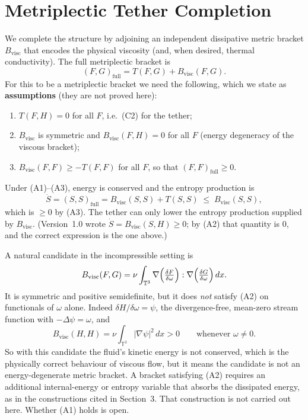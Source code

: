 \documentclass[11pt,a4paper]{article}
\begin{document}
\section{Metriplectic Tether Completion}
We complete the structure by adjoining an independent dissipative metric bracket \(B_{\mathrm{visc}}\) that encodes the physical viscosity (and, when desired, thermal conductivity). The full metriplectic bracket is
\begin{equation}
(F,G)_{\mathrm{full}} = T(F,G) + B_{\mathrm{visc}}(F,G).
\end{equation}
For this to be a metriplectic bracket we need the following, which we state as \textbf{assumptions} (they are not proved here):
\begin{enumerate}[label=(A\arabic*)]
\item \(T(F,H)=0\) for all \(F\), i.e.\ (C2) for the tether;
\item \(B_{\mathrm{visc}}\) is symmetric and \(B_{\mathrm{visc}}(F,H)=0\) for all \(F\) (energy degeneracy of the viscous bracket);
\item \(B_{\mathrm{visc}}(F,F)\ge -T(F,F)\) for all \(F\), so that \((F,F)_{\mathrm{full}}\ge0\).
\end{enumerate}
Under (A1)--(A3), energy is conserved and the entropy production is
\begin{equation}
\dot S = (S,S)_{\mathrm{full}} = B_{\mathrm{visc}}(S,S) + T(S,S) \;\le\; B_{\mathrm{visc}}(S,S),
\end{equation}
which is \(\ge0\) by (A3). The tether can only lower the entropy production supplied by \(B_{\mathrm{visc}}\). (Version~1.0 wrote \(\dot S=B_{\mathrm{visc}}(S,H)\ge0\); by (A2) that quantity is \(0\), and the correct expression is the one above.)

A natural candidate in the incompressible setting is
\begin{equation}
B_{\mathrm{visc}}(F,G) = \nu\int_{\mathbb{T}^3}
\nabla\Bigl(\tfrac{\delta F}{\delta\omega}\Bigr):\nabla\Bigl(\tfrac{\delta G}{\delta\omega}\Bigr)\,dx .
\end{equation}
It is symmetric and positive semidefinite, but it does \emph{not} satisfy (A2) on functionals of \(\omega\) alone. Indeed \(\delta H/\delta\omega=\psi\), the divergence-free, mean-zero stream function with \(-\Delta\psi=\omega\), and
\[
B_{\mathrm{visc}}(H,H)=\nu\int_{\mathbb{T}^3}|\nabla\psi|^2\,dx>0\qquad\text{whenever }\omega\neq0 .
\]
So with this candidate the fluid's kinetic energy is not conserved, which is the physically correct behaviour of viscous flow, but it means the candidate is not an energy-degenerate metric bracket. A bracket satisfying (A2) requires an additional internal-energy or entropy variable that absorbs the dissipated energy, as in the constructions cited in Section~3. That construction is not carried out here. Whether (A1) holds is open.
\end{document}
